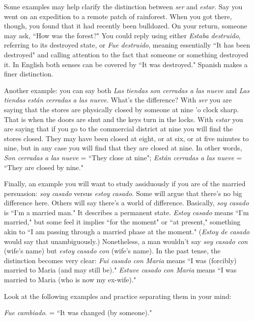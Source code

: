 Some examples may help clarify the distinction between \emph{ser}
and \emph{estar}. Say you went on an expedition to a remote patch of rainforest. When you got there, though, you found that it had recently been
bulldozed. On your return, someone may ask, ``How was the forest?"
You could reply using either \emph{Estaba destruido}, referring to its destroyed state, or \emph{Fue destruido}, meaning essentially ``It has been destroyed" and calling attention to the fact that someone or something
destroyed it. In English both senses can be covered by ``It was destroyed." Spanish makes a finer distinction.

Another example: you can say both \emph{Las tiendas son cerradas a
las nueve} and \emph{Las tiendas están cerradas a las nueve}. What's the difference? With \emph{ser} you are saying that the stores are physically closed
by someone at nine 'o clock sharp. That is when the doors are shut and
the keys turn in the locks. With \emph{estar} you are saying that if you go to
the commercial district at nine you will find the stores closed. They
may have been closed at eight, or at six, or at five minutes to nine, but
in any case you will find that they are closed at nine. In other words,
\emph{Son cerradas a las nueve} = ``They close at nine"; \emph{Están cerradas a las
nueve} = ``They are closed by nine."

Finally, an example you will want to study assiduously if you
are of the married persuasion: \emph{soy casado} versus \emph{estoy casado}. Some
will argue that there's no big difference here. Others will say there's a
world of difference. Basically, \emph{soy casado} is ``I'm a married man." It
describes a permanent state. \emph{Estoy casado} means ``I'm married," but
some feel it implies ``for the moment" or ``at present," something akin
to ``I am passing through a married phase at the moment." (\emph{Estoy de
casado} would say that unambiguously.) Nonetheless, a man wouldn't
say \emph{soy casado con} (wife's name) but \emph{estoy casado con} (wife's name).
In the past tense, the distinction becomes very clear: \emph{Fui casado con
Maria} means ``I was (forcibly) married to Maria (and may still be)." \emph{Estuve casado con Maria} means ``I was married to Maria (who is now my ex-wife)."

Look at the following examples and practice separating them
in your mind:

\bsk

\indu \emph{Fue cambiado}. = ``It was changed (by someone)."

